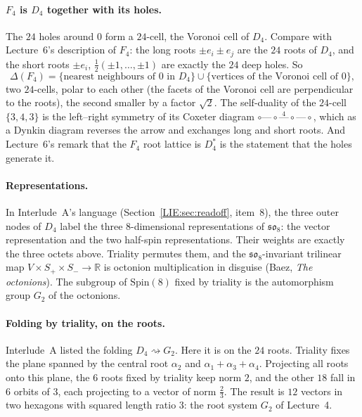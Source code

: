 \documentclass[11pt,openany]{book}
\theoremstyle{plain}
\theoremstyle{definition}
\theoremstyle{remark}
\newcommand{\R}{\mathbb{R}}
\begin{document}
\paragraph{$F_4$ is $D_4$ together with its holes.} The $24$ holes around $0$ form a $24$-cell, the Voronoi
cell of $D_4$. Compare with Lecture~6's description of $F_4$: the long roots $\pm e_i\pm e_j$ are the
$24$ roots of $D_4$, and the short roots $\pm e_i$, $\frac12(\pm1,\dots,\pm1)$ are exactly the $24$ deep
holes. So
\[
  \Delta(F_4)=\{\text{nearest neighbours of }0\text{ in }D_4\}\cup\{\text{vertices of the Voronoi cell of }0\},
\]
two $24$-cells, polar to each other (the facets of the Voronoi cell are perpendicular to the roots), the
second smaller by a factor $\sqrt2$. The self-duality of the
$24$-cell $\{3,4,3\}$ is the left--right symmetry of its Coxeter diagram
$\circ\text{---}\circ\overset{4}{\text{---}}\circ\text{---}\circ$, which as a Dynkin diagram reverses the
arrow and exchanges long and short roots. And Lecture~6's remark that the $F_4$ root lattice is
$D_4^*$ is the statement that the holes generate it.

\paragraph{Representations.} In Interlude~A's language (Section~\ref{LIE:sec:readoff}, item~8), the three
outer nodes of $D_4$ label the three $8$-dimensional representations of $\mathfrak{so}_8$: the vector
representation and the two half-spin representations. Their weights are exactly the three octets above.
Triality permutes them, and the $\mathfrak{so}_8$-invariant trilinear map
$V\times S_+\times S_-\to\R$ is octonion multiplication in disguise (Baez, \emph{The octonions}). The
subgroup of $\mathrm{Spin}(8)$ fixed by triality is the automorphism group $G_2$ of the octonions.

\paragraph{Folding by triality, on the roots.} Interlude~A listed the folding $D_4\rightsquigarrow G_2$.
Here it is on the $24$ roots. Triality fixes the plane spanned by the central root $\alpha_2$ and
$\alpha_1+\alpha_3+\alpha_4$. Projecting all roots onto this plane, the $6$ roots fixed by triality keep
norm $2$, and the other $18$ fall in $6$ orbits of $3$, each projecting to a vector of norm $\frac23$. The
result is $12$ vectors in two hexagons with squared length ratio $3$: the root system $G_2$ of
Lecture~4.
\end{document}
